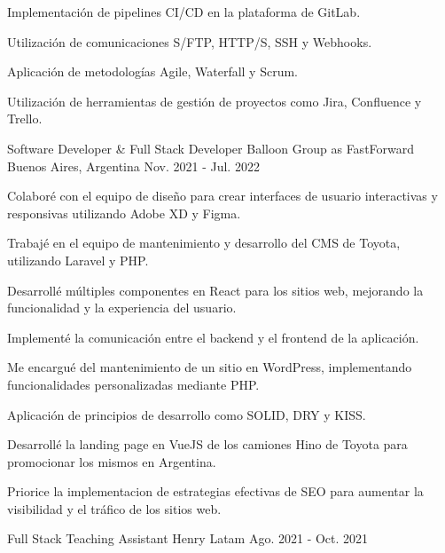 \begin{cventries}
{\begin{cvitems}
        \item {Implementación de pipelines CI/CD en la plataforma de GitLab.}
        \item {Utilización de comunicaciones S/FTP, HTTP/S, SSH y Webhooks.}
        \item {Aplicación de metodologías Agile, Waterfall y Scrum.}
        \item {Utilización de herramientas de gestión de proyectos como Jira, Confluence y Trello.}
      \end{cvitems}
    }
  \vspace{5.5mm}
  \cventry
    {Software Developer \& Full Stack Developer} %
    {Balloon Group as FastForward} %
    {Buenos Aires, Argentina} %
    {Nov. 2021 - Jul. 2022} %
    {
      \begin{cvitems} %
        \item {Colaboré con el equipo de diseño para crear interfaces de usuario interactivas y responsivas utilizando Adobe XD y Figma.}
        \item {Trabajé en el equipo de mantenimiento y desarrollo del CMS de Toyota, utilizando Laravel y PHP.}
        \item {Desarrollé múltiples componentes en React para los sitios web, mejorando la funcionalidad y la experiencia del usuario.}
        \item {Implementé la comunicación entre el backend y el frontend de la aplicación.}
        \item {Me encargué del mantenimiento de un sitio en WordPress, implementando funcionalidades personalizadas mediante PHP.}
        \item {Aplicación de principios de desarrollo como SOLID, DRY y KISS.}
        \item {Desarrollé la landing page en VueJS de los camiones Hino de Toyota para promocionar los mismos en Argentina.}
        \item { Priorice la implementacion de estrategias efectivas de SEO para aumentar la visibilidad y el tráfico de los sitios web.}
      \end{cvitems}
    }
  \vspace{5.5mm}
  \cventry
    {Full Stack Teaching Assistant} %
    {Henry} %
    {Latam} %
    {Ago. 2021 - Oct. 2021} %
    {
      \begin{cvitems} %

\end{cvitems}}
\end{cventries}
